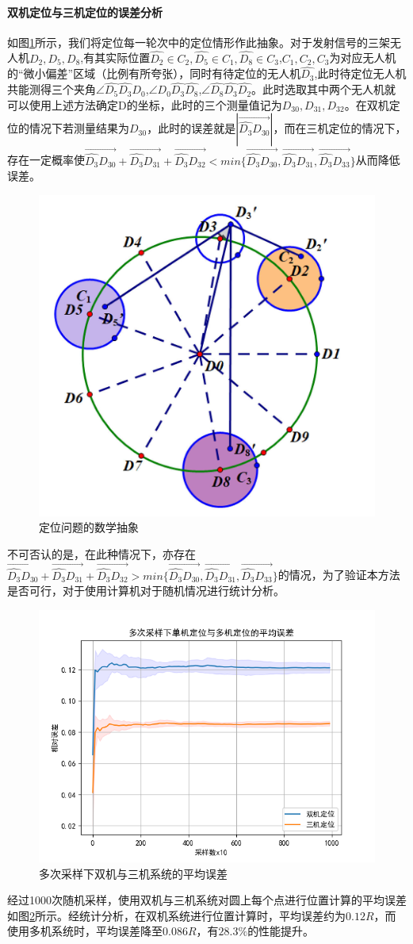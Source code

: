 \documentclass[withoutpreface,bwprint]{cumcmthesis} %
\begin{document}
			
				\paragraph{双机定位与三机定位的误差分析}
			如图\ref{fig16}所示，我们将定位每一轮次中的定位情形作此抽象。对于发射信号的三架无人机$D_2,D_5,D_8$,有其实际位置$\widehat{D_2}\in C_2,\widehat{D_5} \in C_1,\widehat{D_8}\in C_3$,$C_1,C_2,C_3$为对应无人机的“微小偏差”区域（比例有所夸张），同时有待定位的无人机$\widehat{D_3}$,此时待定位无人机共能测得三个夹角$\angle \widehat{D_5}\widehat{D_3}D_0$,$\angle D_0\widehat{D_3}\widehat{D_8}$,$\angle \widehat{D_8}\widehat{D_3}\widehat{D_2}$。此时选取其中两个无人机就可以使用上述方法确定D的坐标，此时的三个测量值记为$D_{30},D_{31},D_{32}$。在双机定位的情况下若测量结果为$D_{30}$，此时的误差就是$|\overrightarrow{\widehat{D_3}D_{30}}|$，而在三机定位的情况下，存在一定概率使$\overrightarrow{\widehat{D_3}D_{30}}+\overrightarrow{\widehat{D_3}D_{31}}+\overrightarrow{\widehat{D_3}D_{32}} < min\{\overrightarrow{\widehat{D_3}D_{30}},\overrightarrow{\widehat{D_3}D_{31}},\overrightarrow{\widehat{D_3}D_{33}}\}$从而降低误差。
			\begin{figure}[H]
				\centering
				\includegraphics[width=0.3\linewidth]{./figures/16}
				\caption{定位问题的数学抽象}
				\label{fig16}
			\end{figure}
			不可否认的是，在此种情况下，亦存在$\overrightarrow{\widehat{D_3}D_{30}}+\overrightarrow{\widehat{D_3}D_{31}}+\overrightarrow{\widehat{D_3}D_{32}} > min\{\overrightarrow{\widehat{D_3}D_{30}},\overrightarrow{\widehat{D_3}D_{31}},\overrightarrow{\widehat{D_3}D_{33}}\}$的情况，为了验证本方法是否可行，对于使用计算机对于随机情况进行统计分析。
			\begin{figure}[H]
				\centering
				\includegraphics[width=0.45\linewidth]{./figures/15}
				\caption{多次采样下双机与三机系统的平均误差}
				\label{fig15}
			\end{figure}
			经过1000次随机采样，使用双机与三机系统对圆上每个点进行位置计算的平均误差如图\ref{fig15}所示。经统计分析，在双机系统进行位置计算时，平均误差约为$0.12R$，而使用多机系统时，平均误差降至$0.086R$，有$28.3\%$的性能提升。
		
\end{document}
